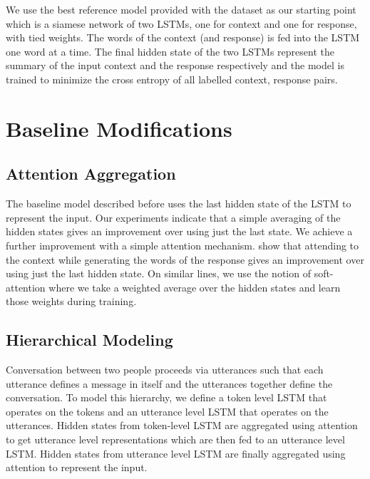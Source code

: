 \documentclass[11pt]{report}
\begin{document}
We use the best reference model provided with the dataset as our starting point which is a siamese network of two LSTMs, one for context and one for response, with tied weights. The words of the context (and response) is fed into the LSTM one word at a time. The final hidden state of the two LSTMs represent the summary of the input context and the response respectively and the model is trained to minimize the cross entropy of all labelled context, response pairs.

\section{Baseline Modifications}\label{baseline_modifications}

\subsection{Attention Aggregation}\label{attention_aggregation}

The baseline model described before uses the last hidden state of the LSTM to represent the input. Our experiments indicate that a simple averaging of the hidden states gives an improvement over using just the last state. We achieve a further improvement with a simple attention mechanism. %
\cite{yao2016attentional} show that attending to the context while generating the words of the response gives an improvement over using just the last hidden state. On similar lines, we use the notion of soft-attention where we take a weighted average over the hidden states and learn those weights during training. 

\subsection{Hierarchical Modeling}\label{hierarchical_modeling}

Conversation between two people proceeds via utterances such that each utterance defines a message in itself and the utterances together define the conversation. To model this hierarchy, we define a token level LSTM that operates on the tokens and an utterance level LSTM that operates on the utterances. Hidden states from token-level LSTM are aggregated using attention to get utterance level representations which are then fed to an utterance level LSTM. Hidden states from utterance level LSTM are finally aggregated using attention to represent the input. %
\end{document}
